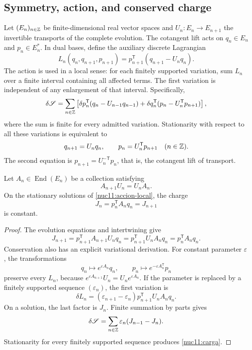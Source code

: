 \subsection{Symmetry, action, and conserved charge}

Let \((E_n)_{n\in\mathbb Z}\) be finite-dimensional real vector spaces and \(U_n:E_n\to E_{n+1}\) the invertible transports of the complete evolution. The cotangent lift acts on \(q_n\in E_n\) and \(p_n\in E_n^*\). In dual bases, define the auxiliary discrete Lagrangian
\[
 L_n(q_n,q_{n+1},p_{n+1})
 =p_{n+1}^{\mathsf T}(q_{n+1}-U_nq_n).
\]
The action is used in a local sense: for each finitely supported variation, sum \(L_n\) over a finite interval containing all affected terms. The first variation is independent of any enlargement of that interval. Specifically,
\begin{equation}
 \delta\mathscr S
 =\sum_{n\in\mathbb Z}
 \left[
  \delta p_n^{\mathsf T}(q_n-U_{n-1}q_{n-1})
  +\delta q_n^{\mathsf T}(p_n-U_n^{\mathsf T}p_{n+1})
 \right],
 \label{nuc11:accion-local}
\end{equation}
where the sum is finite for every admitted variation. Stationarity with respect to all these variations is equivalent to
\[
 q_{n+1}=U_nq_n,\qquad
 p_n=U_n^{\mathsf T}p_{n+1}
 \quad(n\in\mathbb Z).
\]
The second equation is \(p_{n+1}=U_n^{-\mathsf T}p_n\), that is, the cotangent lift of transport.

\begin{proposition}
\label{nuc11:noether}
Let \(A_n\in\operatorname{End}(E_n)\) be a collection satisfying
\[
 A_{n+1}U_n=U_nA_n.
\]
On the stationary solutions of \eqref{nuc11:accion-local}, the charge
\begin{equation}
 \boxed{J_n=p_n^{\mathsf T}A_nq_n=J_{n+1}}
 \label{nuc11:carga}
\end{equation}
is constant.
\end{proposition}
\begin{proof}
The evolution equations and intertwining give
\[
 J_{n+1}
 =p_{n+1}^{\mathsf T}A_{n+1}U_nq_n
 =p_{n+1}^{\mathsf T}U_nA_nq_n
 =p_n^{\mathsf T}A_nq_n.
\]
Conservation also has an explicit variational derivation. For constant parameter \(\varepsilon\), the transformations
\[
 q_n\mapsto e^{\varepsilon A_n}q_n,\qquad
 p_n\mapsto e^{-\varepsilon A_n^{\mathsf T}}p_n
\]
preserve every \(L_n\), because \(e^{\varepsilon A_{n+1}}U_n=U_ne^{\varepsilon A_n}\). If the parameter is replaced by a finitely supported sequence \((\varepsilon_n)\), the first variation is
\[
 \delta L_n
 =(\varepsilon_{n+1}-\varepsilon_n)
   p_{n+1}^{\mathsf T}U_nA_nq_n.
\]
On a solution, the last factor is \(J_n\). Finite summation by parts gives
\[
 \delta\mathscr S
 =\sum_{n\in\mathbb Z}\varepsilon_n(J_{n-1}-J_n).
\]
Stationarity for every finitely supported sequence produces \eqref{nuc11:carga}.
\end{proof}

